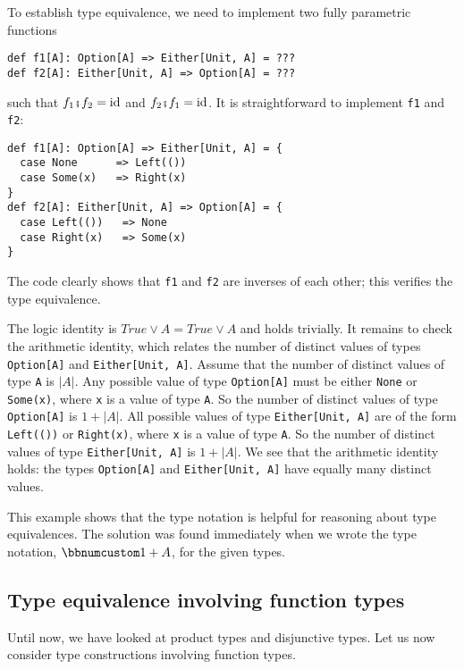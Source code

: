 To establish type equivalence, we need to implement two fully parametric
functions
\begin{lstlisting}
def f1[A]: Option[A] => Either[Unit, A] = ???
def f2[A]: Either[Unit, A] => Option[A] = ???
\end{lstlisting}
such that $f_{1}\bef f_{2}=\text{id}$ and $f_{2}\bef f_{1}=\text{id}$.
It is straightforward to implement \lstinline!f1! and \lstinline!f2!:
\begin{lstlisting}
def f1[A]: Option[A] => Either[Unit, A] = {
  case None      => Left(())
  case Some(x)   => Right(x)
}
def f2[A]: Either[Unit, A] => Option[A] = {
  case Left(())   => None
  case Right(x)   => Some(x)
}
\end{lstlisting}
The code clearly shows that \lstinline!f1! and \lstinline!f2! are
inverses of each other; this verifies the type equivalence.

The logic identity is $True\vee A=True\vee A$ and holds trivially.
It remains to check the arithmetic identity, which relates the number
of distinct values of types \lstinline!Option[A]! and \lstinline!Either[Unit, A]!.
Assume that the number of distinct values of type \lstinline!A! is
$\left|A\right|$. Any possible value of type \lstinline!Option[A]!
must be either \lstinline!None! or \lstinline!Some(x)!, where \lstinline!x!
is a value of type \lstinline!A!. So the number of distinct values
of type \lstinline!Option[A]! is $1+\left|A\right|$. All possible
values of type \lstinline!Either[Unit, A]! are of the form \lstinline!Left(())!
or \lstinline!Right(x)!, where \lstinline!x! is a value of type
\lstinline!A!. So the number of distinct values of type \lstinline!Either[Unit, A]!
is $1+\left|A\right|$. We see that the arithmetic identity holds:
the types \lstinline!Option[A]! and \lstinline!Either[Unit, A]!
have equally many distinct values.

This example shows that the type notation is helpful for reasoning
about type equivalences. The solution was found immediately when we
wrote the type notation, $\bbnum 1+A$, for the given types.

\subsection{Type equivalence involving function types}

Until now, we have looked at product types and disjunctive types.
Let us now consider type constructions involving function types.

